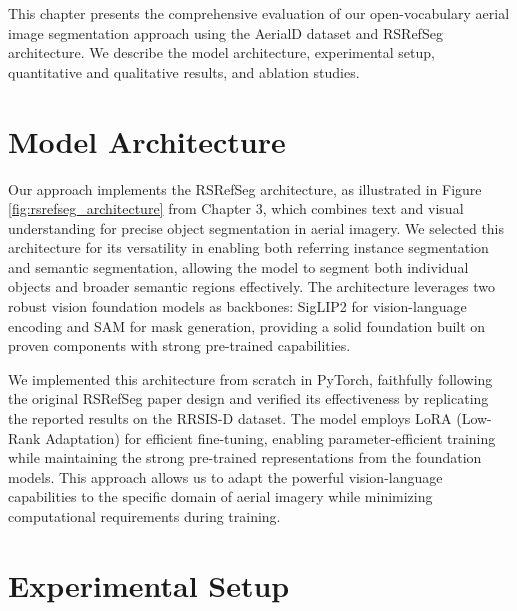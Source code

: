 \cleardoublepage
\label{chap:evaluation}

This chapter presents the comprehensive evaluation of our open-vocabulary aerial image segmentation approach using the AerialD dataset and RSRefSeg architecture. We describe the model architecture, experimental setup, quantitative and qualitative results, and ablation studies.

\section{Model Architecture}

Our approach implements the RSRefSeg architecture, as illustrated in Figure \ref{fig:rsrefseg_architecture} from Chapter 3, which combines text and visual understanding for precise object segmentation in aerial imagery. We selected this architecture for its versatility in enabling both referring instance segmentation and semantic segmentation, allowing the model to segment both individual objects and broader semantic regions effectively. The architecture leverages two robust vision foundation models as backbones: SigLIP2 for vision-language encoding and SAM for mask generation, providing a solid foundation built on proven components with strong pre-trained capabilities.

We implemented this architecture from scratch in PyTorch, faithfully following the original RSRefSeg paper design and verified its effectiveness by replicating the reported results on the RRSIS-D dataset. The model employs LoRA (Low-Rank Adaptation) for efficient fine-tuning, enabling parameter-efficient training while maintaining the strong pre-trained representations from the foundation models. This approach allows us to adapt the powerful vision-language capabilities to the specific domain of aerial imagery while minimizing computational requirements during training.

\section{Experimental Setup}

